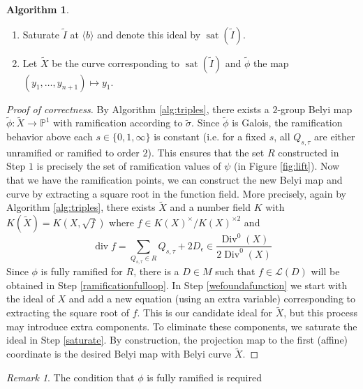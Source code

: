 \documentclass{dcthesis}
\newcommand{\PP}{\mathbb P}
\newcommand{\wt}[1]{\widetilde{#1}}
\newcommand{\LL}{\mathscr L}
\DeclareMathOperator{\Div}{Div}
\DeclareMathOperator{\ddiv}{div}
\DeclareMathOperator{\sat}{sat}
\theoremstyle{definition}
\newtheorem{alg}[prop]{Algorithm}
\theoremstyle{remark}
\newtheorem{remark}[prop]{Remark}
\numberwithin{equation}{section}
\numberwithin{figure}{section}
\begin{document}
{{\begin{alg}
\begin{enumerate}
        \item
          \label{saturate}
          Saturate $\wt{I}$ at $\langle b\rangle$ and denote this ideal by $\sat(\wt{I})$.
        \item
          Let $\wt{X}$ be the curve corresponding to $\sat(\wt{I})$ and
          $\wt{\phi}$ the map $(y_1,\dots,y_{n+1})\mapsto y_1$.
      \end{enumerate}
    \end{alg}
    \begin{proof}[Proof of correctness]
      By Algorithm \ref{alg:triples},
      there exists a $2$-group Belyi map $\wt{\phi}:\wt{X}\to\PP^1$
      with ramification according to $\wt{\sigma}$.
      Since $\wt{\phi}$ is Galois,
      the ramification behavior above each $s\in\{0,1,\infty\}$
      is constant
      (i.e. for a fixed $s$, all $Q_{s,\tau}$ are either unramified or
      ramified to order $2$).
      This ensures that the set $R$ constructed in Step $1$
      is precisely the set of ramification values of $\psi$
      (in Figure \ref{fig:lift}).
      Now that we have the ramification points,
      we can construct the new Belyi map and curve
      by extracting a square root in the function field.
      More precisely,
      again by Algorithm \ref{alg:triples},
      there exists $\wt{X}$ and a number field $K$
      with $K(\wt{X}) = K(X,\sqrt{f})$
      where $f\in K(X)^\times/K(X)^{\times 2}$
      and
      \begin{equation}\label{eqn:classgroup}
        \ddiv f= \sum_{Q_{s,\tau}\in R} Q_{s,\tau}+2D_\epsilon
        \in\frac{\Div^0(X)}{2\Div^0(X)}
      \end{equation}
      Since $\phi$ is fully ramified for $R$,
      there is a $D\in M$ such that
      $f\in\LL(D)$
      will be obtained in Step \ref{ramificationfulloop}.
      In Step \ref{wefoundafunction}
      we start with the ideal of $X$
      and add a new equation (using an extra variable)
      corresponding to extracting the square root of $f$.
      This is our candidate ideal for $\wt{X}$,
      but this process may introduce extra components.
      To eliminate these components, we saturate the ideal
      in Step \ref{saturate}.
      By construction,
      the projection map to the first (affine)
      coordinate
      is the desired Belyi map
      with Belyi curve $\wt{X}$.
    \end{proof}
    \begin{remark}
      \label{rmk:fullyramifiedinpractice}
      The condition that $\phi$
      is fully ramified is required

\end{remark}}}
\end{document}
